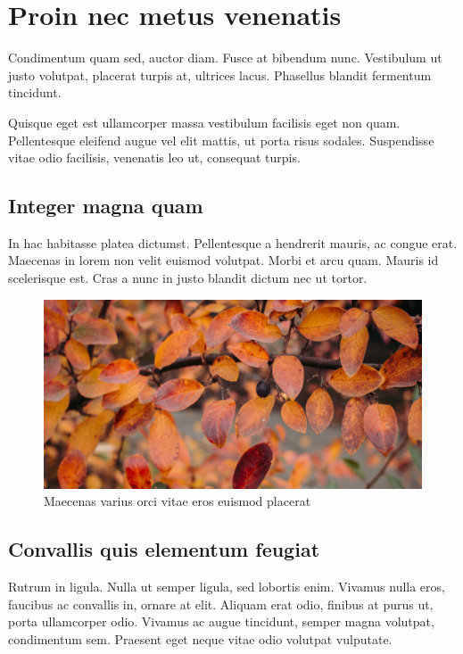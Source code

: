 \section{Proin nec metus venenatis} \label{sec:proin}

Condimentum quam sed, auctor diam. Fusce at bibendum nunc. Vestibulum ut justo
volutpat, placerat turpis at, ultrices lacus. Phasellus blandit fermentum tincidunt.

Quisque eget est ullamcorper massa vestibulum facilisis eget non quam. Pellentesque
eleifend augue vel elit mattis, ut porta risus sodales. Suspendisse vitae odio
facilisis, venenatis leo ut, consequat turpis.

\subsection{Integer magna quam}

In hac habitasse platea dictumst. Pellentesque a hendrerit mauris, ac congue
erat. Maecenas in lorem non velit euismod volutpat. Morbi et arcu quam. Mauris
id scelerisque est. Cras a nunc in justo blandit dictum nec ut tortor.

\begin{figure}[hb]
\centering\includegraphics[scale=1]{images/orange2.jpg}
\caption{Maecenas varius orci vitae eros euismod placerat} \label{fig:integer}
\end{figure}

\subsection{Convallis quis elementum feugiat}

Rutrum in ligula. Nulla ut semper ligula, sed lobortis enim. Vivamus nulla eros,
faucibus ac convallis in, ornare at elit. Aliquam erat odio, finibus at purus ut,
porta ullamcorper odio. Vivamus ac augue tincidunt, semper magna volutpat,
condimentum sem. Praesent eget neque vitae odio volutpat vulputate.
